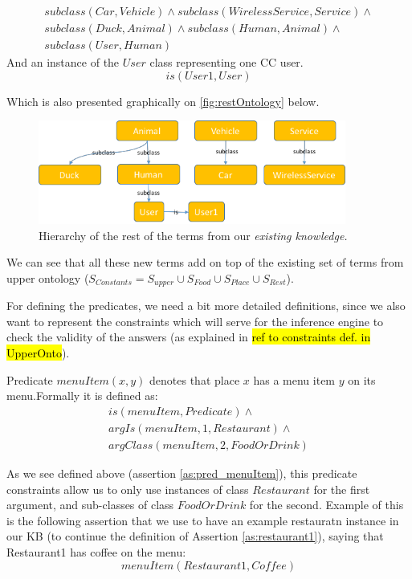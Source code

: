 \begin{equation}\label{as:kbPlaceSubclasses}
\begin{gathered}
    subclass(Car,Vehicle) \land subclass(WirelessService,Service)\land\\
	subclass(Duck,Animal)\land subclass(Human,Animal)\land \\
	subclass(User,Human)
\end{gathered}
\end{equation}
And an instance of the $User$ class representing one CC user.
\begin{equation}
	is(User1,User)
\end{equation}

Which is also presented graphically on \autoref{fig:restOntology} below.
\begin{figure}[H]
	\centering
		\includegraphics[width=0.9\textwidth]{figures/restOntology.png}
	\caption{Hierarchy of the rest of the terms from our \emph{existing 
	knowledge.}}
	\label{fig:restOntology}
\end{figure}
We can see that all these new terms add on top of the existing set of terms from 
upper ontology ($S_{Constants} = S_{upper} \cup S_{Food} \cup S_{Place} 
\cup S_{Rest}$). 

For defining the predicates, we need a bit more detailed definitions, since we 
also want to represent the constraints which will serve for the inference 
engine to check the validity of the answers (as explained in 
\hl{ref to constraints def. in UpperOnto}).

\begin{definition}\label{def:menuItem}
Predicate $menuItem(x,y)$ denotes that place $x$ has a menu item $y$ on its 
menu.Formally it is defined as:
\begin{equation}\label{as:pred_menuItem}
\begin{gathered}
    is(menuItem,Predicate) \land \\
	argIs(menuItem,1,Restaurant) \land\\
	argClass(menuItem,2,FoodOrDrink)
\end{gathered}
\end{equation}
\end{definition}
As we see defined above (assertion \ref{as:pred_menuItem}), this predicate
constraints allow us to only use instances of class $Restaurant$ for the first
argument, and sub-classes of class $FoodOrDrink$ for the second. Example of this
is the following assertion that we use to have an example restauratn instance
in our KB (to continue the definition of Assertion \ref{as:restaurant1}), saying
that Restaurant1 has coffee on the menu:
\begin{equation}
menuItem(Restaurant1,Coffee)
\end{equation}


